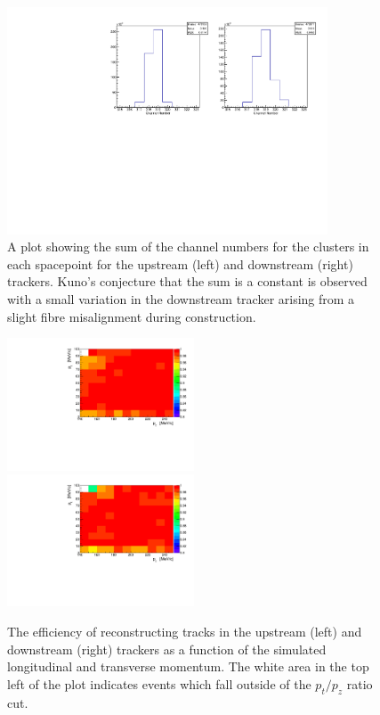   \begin{figure}[p]
    \centering
    \includegraphics[width=0.85\textwidth, angle=0]{08-Performance/kuno_plot.pdf}
    \caption{\label{fig:kuno} A plot showing the sum of the channel numbers for the clusters in each spacepoint for the upstream (left) and downstream (right) trackers. Kuno's conjecture that the sum is a constant is observed with a small variation in the downstream tracker arising from a slight fibre misalignment during construction.}
  \end{figure}
  
  \begin{figure}[p]
    \centering
    \includegraphics[width=0.495\textwidth, angle=0]{08-Performance/upstream_track_efficiency.pdf}
    \includegraphics[width=0.495\textwidth, angle=0]{08-Performance/downstream_track_efficiency.pdf}\\
    \caption{\label{fig:track_efficiency} The efficiency of reconstructing tracks in the upstream (left) and downstream (right) trackers as a function of the simulated longitudinal and transverse momentum. The white area in the top left of the plot indicates events which fall outside of the $p_t/p_z$ ratio cut.}
  \end{figure}
  
